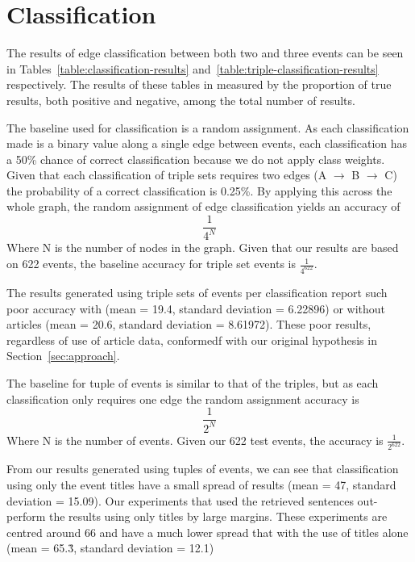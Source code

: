 \documentclass[bsc,frontabs,twoside,singlespacing,parskip,deptreport]{infthesis}     %
\begin{document}
\section{Classification}
The results of edge classification between both two and three events can be seen in Tables~\ref{table:classification-results}
and~\ref{table:triple-classification-results} respectively. The results of these tables in measured by the
proportion of true results, both positive and negative, among the total number of results.

The baseline used for classification is a random assignment.
As each classification made is a binary value along a single edge between events, each classification has a
50\% chance of correct classification because we do not apply class weights.
Given that each classification of triple sets requires two edges (A $\rightarrow$ B $\rightarrow$ C) the probability of a correct
classification is 0.25\%. By applying this across the whole graph, the random assignment of edge classification yields an
accuracy of
\begin{equation}
\frac{1}{4^N} \nonumber
\end{equation}
Where N is the number of nodes in the graph.
Given that our results are based on 622 events, the baseline accuracy for triple set events is $\frac{1}{4^{622}}$.

The results generated using triple sets of events per classification report such poor accuracy with
(mean = 19.4, standard deviation = 6.22896) or without articles (mean = 20.6, standard deviation = 8.61972). These poor results, regardless of use of article data,
conformedf with our original hypothesis in Section~\ref{sec:approach}. 


The baseline for tuple of events is similar to that of the triples, but as each classification only requires one edge
the random assignment accuracy is
\begin{equation}
  \frac{1}{2^N}\nonumber
\end{equation}
Where N is the number of events.
Given our 622 test events, the accuracy is $\frac{1}{2^{622}}$.


From our results generated using tuples of events, we can see that classification using only the event titles
have a small spread of results (mean = 47, standard deviation = 15.09).
Our experiments that used the retrieved sentences out-perform the results using only titles by large margins.
These experiments are centred around 66 and have a much lower spread that with the use of titles alone
(mean = 65.\.{3}, standard deviation = 12.1)
\end{document}
